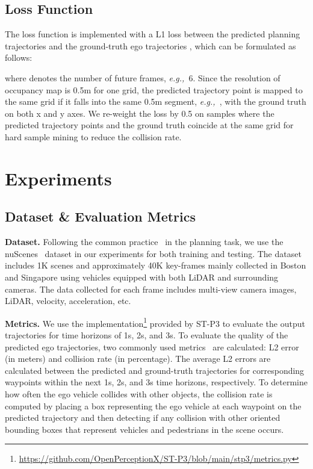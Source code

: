 \documentclass[10pt,twocolumn,letterpaper]{article}
\def\eg{\emph{e.g.,~}}
\newcommand{\myPara}[1]{\vspace{.05in}\noindent\textbf{#1.}\quad}
\begin{document}
\subsection{Loss Function}
The loss function  is implemented with a L1 loss between the predicted planning trajectories  and the ground-truth ego trajectories , which can be formulated as follows: 

where  denotes the number of future frames, \eg{6}. 
Since the resolution of occupancy map is 0.5m for one grid, the predicted trajectory point is mapped to the same grid if it falls into the same 0.5m segment, \eg{}, with the ground truth on both x and y axes. 
We re-weight the loss by 0.5 on samples where the predicted trajectory points and the ground truth coincide at the same grid for hard sample mining to reduce the collision rate. 



\section{Experiments}
\subsection{Dataset \& Evaluation Metrics}
\myPara{Dataset} 
Following the common practice~\cite{hu2022st,hu2022goal,jiang2023vad}
in the planning task,
we use the nuScenes~\cite{caesar2020nuscenes}
dataset in our experiments for both training and testing.
The dataset includes 1K scenes and approximately 40K key-frames 
mainly collected in Boston and Singapore 
using vehicles equipped with both LiDAR and surrounding cameras. 
The data collected for each frame includes multi-view camera images, LiDAR, velocity, acceleration, etc.


\myPara{Metrics}
We use the implementation\footnote{\url{https://github.com/OpenPerceptionX/ST-P3/blob/main/stp3/metrics.py}} provided by ST-P3\cite{hu2022st} to evaluate the output trajectories for time horizons of 1s, 2s, and 3s. 
To evaluate the quality of the predicted ego trajectories, 
two commonly used metrics~\cite{hu2022st,hu2022goal,jiang2023vad} are calculated: 
L2 error (in meters) and collision rate (in percentage).
The average L2 errors are calculated between the predicted and ground-truth trajectories for corresponding waypoints within the next 1s, 2s, and 3s time horizons, respectively. 
To determine how often the ego vehicle 
collides with other objects, 
the collision rate is computed by 
placing a box representing the ego vehicle at each waypoint on the predicted trajectory 
and then detecting if any collision with other oriented bounding boxes that represent vehicles and pedestrians in the scene occurs.
\end{document}
